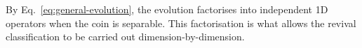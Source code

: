 By Eq.~\eqref{eq:general-evolution}, the evolution factorises into
independent 1D operators when the coin is separable. This factorisation
is what allows the revival classification to be carried out
dimension-by-dimension.
